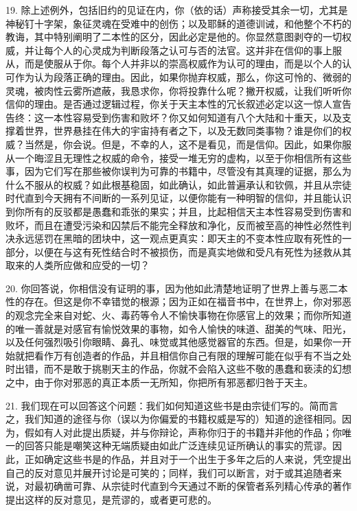 19. 除上述例外，包括旧约的见证在内，你（依的话）声称接受其余一切，尤其是神秘钉十字架，象征灵魂在受难中的创伤；以及耶稣的道德训诫，和他整个不朽的教诲，其中特别阐明了二本性的区分，因此必定是他的。你显然意图剥夺的一切权威，并让每个人的心灵成为判断段落之认可与否的法官。这并非在信仰的事上服从，而是使服从于你。每个人并非以的崇高权威作为认可的理由，而是以个人的认可作为认为段落正确的理由。因此，如果你抛弃权威，那么，你这可怜的、微弱的灵魂，被肉性云雾所遮蔽，我恳求你，你将投靠什么呢？撇开权威，让我们听听你信仰的理由。是否通过逻辑过程，你关于天主本性的冗长叙述必定以这一惊人宣告告终：这一本性容易受到伤害和败坏？你又如何知道有八个大陆和十重天，以及支撑着世界，世界悬挂在伟大的宇宙持有者之下，以及无数同类事物？谁是你们的权威？当然是，你会说。但是，不幸的人，这不是看见，而是信仰。因此，如果你服从一个晦涩且无理性之权威的命令，接受一堆无穷的虚构，以至于你相信所有这些事，因为它们写在那些被你误判为可靠的书籍中，尽管没有其真理的证据，那么为什么不服从的权威？如此根基稳固，如此确认，如此普遍承认和钦佩，并且从宗徒时代直到今天拥有不间断的一系列见证，以便你能有一种明智的信仰，并且能认识到你所有的反驳都是愚蠢和乖张的果实；并且，比起相信天主本性容易受到伤害和败坏，而且在遭受污染和囚禁后不能完全释放和净化，反而被至高的神性必然性判决永远惩罚在黑暗的团块中，这一观点更真实：即天主的不变本性应取有死性的一部分，以便在与这有死性结合时不被损伤，而是真实地做和受凡有死性为拯救从其取来的人类所应做和应受的一切？\par

20. 你回答说，你相信没有证明的事，因为他如此清楚地证明了世界上善与恶二本性的存在。但这是你不幸错觉的根源；因为正如在福音书中，在世界上，你对邪恶的观念完全来自对蛇、火、毒药等令人不愉快事物在你感官上的效果；而你所知道的唯一善就是对感官有愉悦效果的事物，如令人愉快的味道、甜美的气味、阳光，以及任何强烈吸引你眼睛、鼻孔、味觉或其他感觉器官的东西。但是，如果你一开始就把看作万有创造者的作品，并且相信你自己有限的理解可能在似乎有不当之处时出错，而不是敢于挑剔天主的作品，你就不会陷入这些不敬的愚蠢和亵渎的幻想之中，由于你对邪恶的真正本质一无所知，你把所有邪恶都归咎于天主。\par

21. 我们现在可以回答这个问题：我们如何知道这些书是由宗徒们写的。简而言之，我们知道的途径与你（误以为你偏爱的书籍权威是写的）知道的途径相同。因为，假如有人对此提出质疑，并与你辩论，声称你归于的书籍并非他的作品；你唯一的回答只能是嘲笑这种无端质疑由如此广泛连续见证所确认的事实的荒谬。因此，正如确定这些书是的作品，并且对于一个出生于多年之后的人来说，凭空提出自己的反对意见并展开讨论是可笑的；同样，我们可以断言，对于或其追随者来说，对最初确凿可靠、从宗徒时代直到今天通过不断的保管者系列精心传承的著作提出这样的反对意见，是荒谬的，或者更可悲的。\par

